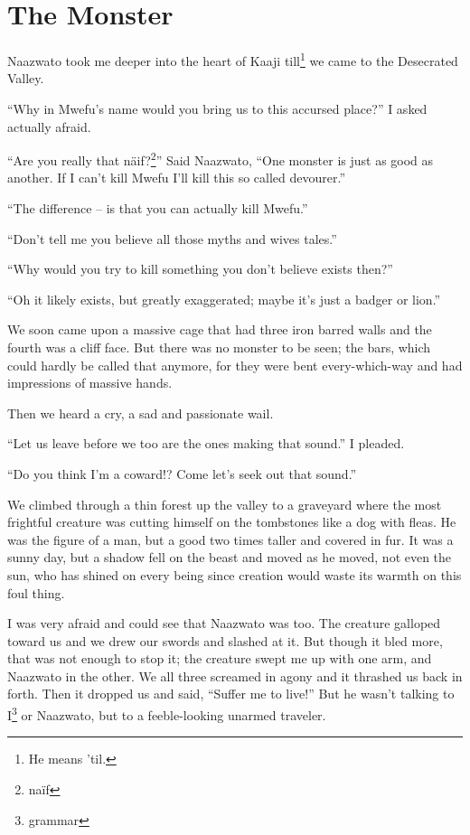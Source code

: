 \chapter{The Monster}
Naazwato took me deeper into the heart of Kaaji till\footnote{He means 'til.} we came to the Desecrated Valley.

``Why in Mwefu's name would you bring us to this accursed place?'' I asked actually afraid.

``Are you really that n{\"a}if?\footnote{na{\"i}f}'' Said Naazwato, ``One monster is just as good as another. If I can't kill Mwefu I'll kill this so called devourer.''

``The difference -- is that you can actually kill Mwefu.''

``Don't tell me you believe all those myths and wives tales.''

``Why would you try to kill something you don't believe exists then?''

``Oh it likely exists, but greatly exaggerated; maybe it's just a badger or lion.''

We soon came upon a massive cage that had three iron barred walls and the fourth was a cliff face. But there was no monster to be seen; the bars, which could hardly be called that anymore, for they were bent every-which-way and had impressions of massive hands.

Then we heard a cry, a sad and passionate wail.

``Let us leave before we too are the ones making that sound.'' I pleaded.

``Do you think I'm a coward!? Come let's seek out that sound.''

We climbed through a thin forest up the valley to a graveyard where the most frightful creature was cutting himself on the tombstones like a dog with fleas.
He was the figure of a man, but a good two times taller and covered in fur.
It was a sunny day, but a shadow fell on the beast and moved as he moved, not even the sun, who has shined on every being since creation would waste its warmth on this foul thing.

I was very afraid and could see that Naazwato was too. The creature galloped toward us and we drew our swords and slashed at it. But though it bled more, that was not enough to stop it; the creature swept me up with one arm, and Naazwato in the other. We all three screamed in agony and it thrashed us back in forth.
Then it dropped us and said, ``Suffer me to live!'' But he wasn't talking to I\footnote{grammar} or Naazwato, but to a feeble-looking unarmed traveler.

